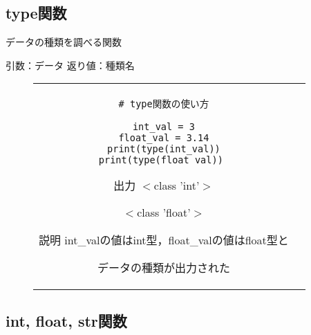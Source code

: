 \documentclass{jsarticle}
\begin{document}
\subsection{type関数}
データの種類を調べる関数 \par
引数：データ \hspace{5mm}
返り値：種類名
\vspace{-5mm}
\begin{figure}[h]
	\begin{tabular}{cc}
		\begin{minipage}[t]{.4\textwidth}
			\begin{lstlisting}[caption=type関数]
# type関数の使い方

int_val = 3
float_val = 3.14
print(type(int_val))
print(type(float_val)) \end{lstlisting}
		\end{minipage} \hspace{5mm}
		\begin{minipage}[t]{.5\textwidth}
			\begin{minipage}[t]{.4\textwidth}
				\begin{itembox}[l]{出力}
					$<$class 'int'$>$ \par
					$<$class 'float'$>$ \par
				\end{itembox}
			\end{minipage}
			\begin{itembox}[l]{説明}
				int\_valの値はint型，float\_valの値はfloat型と \par データの種類が出力された
			\end{itembox}
		\end{minipage} \hspace{5mm}
	\end{tabular}
\end{figure}

\newpage
\subsection{int, float, str関数}
\end{document}
